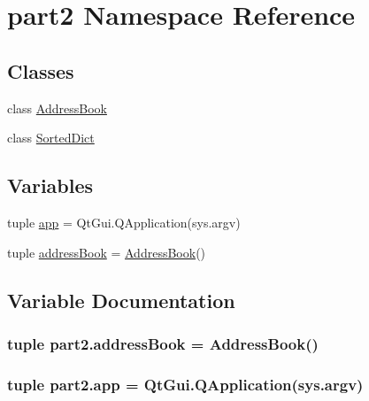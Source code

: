 \hypertarget{namespacepart2}{}\section{part2 Namespace Reference}
\label{namespacepart2}
\subsection*{Classes}
\begin{DoxyCompactItemize}
\item 
class \hyperlink{classpart2_1_1AddressBook}{Address\+Book}
\item 
class \hyperlink{classpart2_1_1SortedDict}{Sorted\+Dict}
\end{DoxyCompactItemize}
\subsection*{Variables}
\begin{DoxyCompactItemize}
\item 
tuple \hyperlink{namespacepart2_a86dfbb17c207359f523d2b5ffdf43981}{app} = Qt\+Gui.\+Q\+Application(sys.\+argv)
\item 
tuple \hyperlink{namespacepart2_a3b10f56e93a46e401a0560def65a0722}{address\+Book} = \hyperlink{classpart2_1_1AddressBook}{Address\+Book}()
\end{DoxyCompactItemize}


\subsection{Variable Documentation}
\hypertarget{namespacepart2_a3b10f56e93a46e401a0560def65a0722}{}
\subsubsection[{address\+Book}]{\setlength{\rightskip}{0pt plus 5cm}tuple part2.\+address\+Book = {\bf Address\+Book}()}\label{namespacepart2_a3b10f56e93a46e401a0560def65a0722}
\hypertarget{namespacepart2_a86dfbb17c207359f523d2b5ffdf43981}{}
\subsubsection[{app}]{\setlength{\rightskip}{0pt plus 5cm}tuple part2.\+app = Qt\+Gui.\+Q\+Application(sys.\+argv)}\label{namespacepart2_a86dfbb17c207359f523d2b5ffdf43981}
